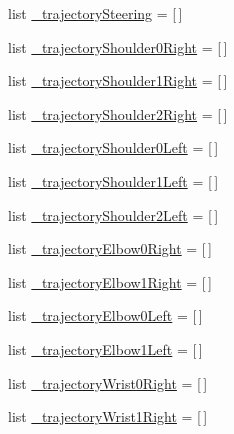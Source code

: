 \begin{DoxyCompactItemize}
list \mbox{\hyperlink{namespacesteering__interpolate__and__print_a3683252d2e76cf6b7f52fab6a666b523}{\+\_\+trajectory\+Steering}} = \mbox{[}$\,$\mbox{]}
\item 
list \mbox{\hyperlink{namespacesteering__interpolate__and__print_a650a608dcaccc50b20b583aabb62aef0}{\+\_\+trajectory\+Shoulder0\+Right}} = \mbox{[}$\,$\mbox{]}
\item 
list \mbox{\hyperlink{namespacesteering__interpolate__and__print_aed97ff59e8c63627b64a08af56c88119}{\+\_\+trajectory\+Shoulder1\+Right}} = \mbox{[}$\,$\mbox{]}
\item 
list \mbox{\hyperlink{namespacesteering__interpolate__and__print_aeb37a220073f3e619eb2fccbd2e95255}{\+\_\+trajectory\+Shoulder2\+Right}} = \mbox{[}$\,$\mbox{]}
\item 
list \mbox{\hyperlink{namespacesteering__interpolate__and__print_a98d1c83505007c74b4fe927221d1b402}{\+\_\+trajectory\+Shoulder0\+Left}} = \mbox{[}$\,$\mbox{]}
\item 
list \mbox{\hyperlink{namespacesteering__interpolate__and__print_a1251e4804c6d90959da84cfbde24934d}{\+\_\+trajectory\+Shoulder1\+Left}} = \mbox{[}$\,$\mbox{]}
\item 
list \mbox{\hyperlink{namespacesteering__interpolate__and__print_a382bf24705e733e94935e29b7131133e}{\+\_\+trajectory\+Shoulder2\+Left}} = \mbox{[}$\,$\mbox{]}
\item 
list \mbox{\hyperlink{namespacesteering__interpolate__and__print_a0f782680d3f83610c4b2cc1261e48e01}{\+\_\+trajectory\+Elbow0\+Right}} = \mbox{[}$\,$\mbox{]}
\item 
list \mbox{\hyperlink{namespacesteering__interpolate__and__print_a7d9c6a55c3de3743f49b31230668cf42}{\+\_\+trajectory\+Elbow1\+Right}} = \mbox{[}$\,$\mbox{]}
\item 
list \mbox{\hyperlink{namespacesteering__interpolate__and__print_ad653c48ea918ab332751bc4a96c995a9}{\+\_\+trajectory\+Elbow0\+Left}} = \mbox{[}$\,$\mbox{]}
\item 
list \mbox{\hyperlink{namespacesteering__interpolate__and__print_a3a1378ee16d7276757876e5a1958cd61}{\+\_\+trajectory\+Elbow1\+Left}} = \mbox{[}$\,$\mbox{]}
\item 
list \mbox{\hyperlink{namespacesteering__interpolate__and__print_a512012e7e5c56f8d5f3f9417174cf9fa}{\+\_\+trajectory\+Wrist0\+Right}} = \mbox{[}$\,$\mbox{]}
\item 
list \mbox{\hyperlink{namespacesteering__interpolate__and__print_a0c281cea15a0f87bac348d1f0e696513}{\+\_\+trajectory\+Wrist1\+Right}} = \mbox{[}$\,$\mbox{]}

\end{DoxyCompactItemize}
